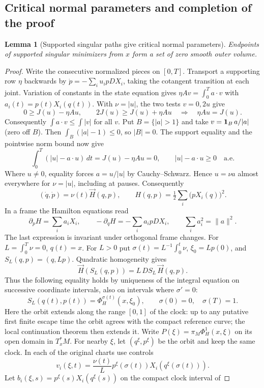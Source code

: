 \documentclass[11pt,letterpaper]{article}
\newcounter{proofgroup}
\newcommand{\proofsection}[1]{\stepcounter{proofgroup}\subsection{#1}}
\newtheorem{lemma}[theorem]{Lemma}
\begin{document}
\proofsection{Critical normal parameters and completion of the proof}
\begin{lemma}[Supported singular paths give critical normal parameters]\label{normal}
Endpoints of supported singular minimizers from $x$ form a set of zero
smooth outer volume.
\end{lemma}
\begin{proof}
Write the consecutive normalized pieces on $[0,T]$. Transport a supporting
row $\eta$ backwards by $\dot p=-\sum_i u_i p DX_i$, taking the cotangent
transition at each joint. Variation of constants in the state equation
gives $\eta Av=\int_0^T a\cdot v$ with $a_i(t)=p(t)X_i(q(t))$.
With $\nu=|u|$, the two tests $v=0,2u$ give
\[
 0\ge J(u)-\eta Au,\qquad 2J(u)\ge J(u)+\eta Au
 \quad\Longrightarrow\quad \eta Au=J(u).
\]
Consequently $\int a\cdot v\le\int|v|$ for all $v$. Put
$B=\{|a|>1\}$ and take $v={\bf1}_B\,a/|a|$ (zero off $B$). Then
$\int_B(|a|-1)\le0$, so $|B|=0$.
The support equality and the pointwise norm bound now give
\begin{equation}\label{deficit}
 \int_0^T (|u|-a\cdot u)\,dt=J(u)-\eta Au=0,\qquad
 |u|-a\cdot u\ge0\quad\text{a.e.}
\end{equation}
Where $u\ne0$, equality forces $a=u/|u|$ by Cauchy--Schwarz. Hence
$u=\nu a$ almost everywhere for $\nu=|u|$, including at pauses. Consequently
\[
  (\dot q,\dot p)=\nu(t)\vec H(q,p),\qquad
  H(q,p)=\tfrac12\sum_i\big(pX_i(q)\big)^2 .
\]
In a frame the Hamilton equations read
\[
 \partial_p H=\sum_i a_iX_i,\qquad
 -\partial_q H=-\sum_i a_i p DX_i,\qquad
 \sum_i a_i^2=\|a\|^2 .
\]
The last expression is invariant under orthogonal frame changes. For
$L=\int_0^T\nu=0$, $q(t)=x$. For $L>0$ put
$\sigma(t)=L^{-1}\int_0^t\nu$, $\xi_0=Lp(0)$, and
$S_L(q,p)=(q,Lp)$. Quadratic homogeneity gives
\[
 \vec H(S_L(q,p))=L\,DS_L\,\vec H(q,p).
\]
Thus the following equality holds by uniqueness of the integral equation
on successive coordinate intervals, also on intervals where $\sigma'=0$:
\[
 S_L(q(t),p(t))=\Phi_H^{\sigma(t)}(x,\xi_0),\qquad
 \sigma(0)=0,\quad \sigma(T)=1 .
\]
Here the orbit extends along the range $[0,1]$ of the clock: up to any
putative first finite escape time the orbit agrees with the compact
reference curve; the local continuation theorem then extends it.
Write $P(\xi)=\pi_M\Phi_H^1(x,\xi)$ on its open domain in $T_x^*M$.
For nearby $\xi$, let $(q^\xi,p^\xi)$ be the orbit and keep the same clock.
In each of the original charts use controls
\[
   v_i(\xi,t)=\frac{\nu(t)}{L}p^\xi(\sigma(t))X_i(q^\xi(\sigma(t))).
\]
Let $b_i(\xi,s)=p^\xi(s)X_i(q^\xi(s))$ on the compact clock interval of

\end{proof}
\end{document}
